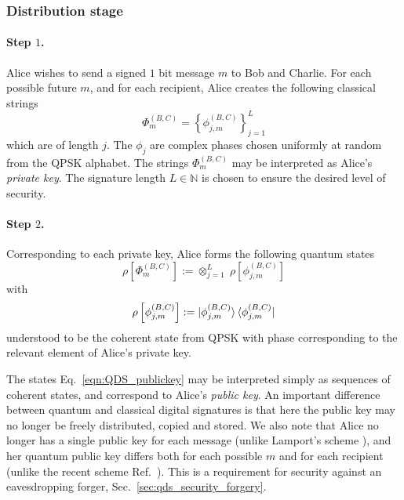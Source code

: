 \subsubsection{Distribution stage}

\paragraph{Step $1$.}
Alice wishes to send a signed $1$ bit message $m$ to Bob and Charlie. For each possible future $m$, and for each recipient, Alice creates the following classical strings
\begin{equation}
\Phi_m^{\left(B, C\right)} = \left\{ \phi_{j, m}^{\left(B, C\right)}\right\}_{j=1}^{L}
\end{equation}
which are of length $j$. The $\phi_{j}$ are complex phases chosen uniformly at random from the QPSK alphabet. The strings $\Phi_m^{\left(B, C\right)}$ may be interpreted as Alice's \emph{private key}. The signature length $L \in \mathbb{N}$ is chosen to ensure the desired level of security.

\paragraph{Step $2$.} Corresponding to each private key, Alice forms the following quantum states
\begin{equation}\label{eqn:QDS_publickey}
\rho\left[\Phi_m^{\left(B, C\right)}\right] := \otimes_{j=1}^L \; \rho\left[\phi_{j, m}^{\left(B, C\right)}\right]
\end{equation}
with
\begin{equation}
\rho\left[\phi_{j, m}^{\left(B, C\right)}\right] := \ket{\phi_{j, m}^{\left(B, C\right)}} \bra{\phi_{j, m}^{\left(B, C\right)}} \notag
\end{equation}
understood to be the coherent state from QPSK with phase corresponding to the relevant element of Alice's private key.

The states Eq.~\ref{eqn:QDS_publickey} may be interpreted simply as sequences of coherent states, and correspond to Alice's \emph{public key}. An important difference between quantum and classical digital signatures is that here the public key may no longer be freely distributed, copied and stored. We also note that Alice no longer has a single public key for each message (unlike Lamport's scheme \cite{Lamport}), and her quantum public key differs both for each possible $m$ and for each recipient (unlike the recent scheme Ref.~\cite{Croal2016}). This is a requirement for security against an eavesdropping forger, Sec.~\ref{sec:qds_security_forgery}.

